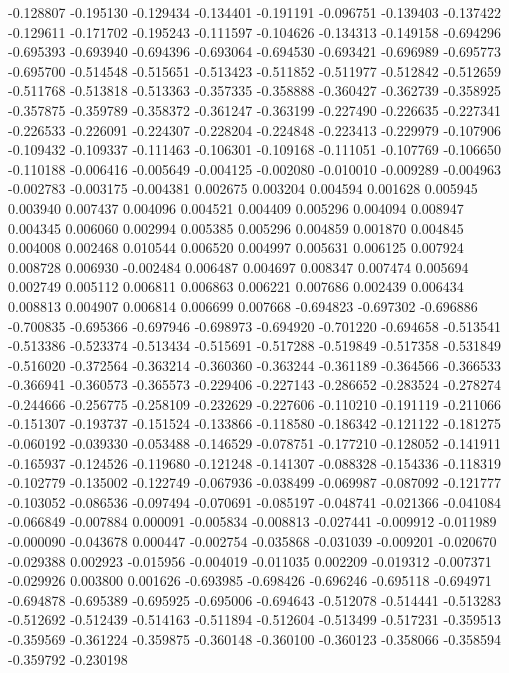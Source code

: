 -0.128807
-0.195130
-0.129434
-0.134401
-0.191191
-0.096751
-0.139403
-0.137422
-0.129611
-0.171702
-0.195243
-0.111597
-0.104626
-0.134313
-0.149158
-0.694296
-0.695393
-0.693940
-0.694396
-0.693064
-0.694530
-0.693421
-0.696989
-0.695773
-0.695700
-0.514548
-0.515651
-0.513423
-0.511852
-0.511977
-0.512842
-0.512659
-0.511768
-0.513818
-0.513363
-0.357335
-0.358888
-0.360427
-0.362739
-0.358925
-0.357875
-0.359789
-0.358372
-0.361247
-0.363199
-0.227490
-0.226635
-0.227341
-0.226533
-0.226091
-0.224307
-0.228204
-0.224848
-0.223413
-0.229979
-0.107906
-0.109432
-0.109337
-0.111463
-0.106301
-0.109168
-0.111051
-0.107769
-0.106650
-0.110188
-0.006416
-0.005649
-0.004125
-0.002080
-0.010010
-0.009289
-0.004963
-0.002783
-0.003175
-0.004381
0.002675
0.003204
0.004594
0.001628
0.005945
0.003940
0.007437
0.004096
0.004521
0.004409
0.005296
0.004094
0.008947
0.004345
0.006060
0.002994
0.005385
0.005296
0.004859
0.001870
0.004845
0.004008
0.002468
0.010544
0.006520
0.004997
0.005631
0.006125
0.007924
0.008728
0.006930
-0.002484
0.006487
0.004697
0.008347
0.007474
0.005694
0.002749
0.005112
0.006811
0.006863
0.006221
0.007686
0.002439
0.006434
0.008813
0.004907
0.006814
0.006699
0.007668
-0.694823
-0.697302
-0.696886
-0.700835
-0.695366
-0.697946
-0.698973
-0.694920
-0.701220
-0.694658
-0.513541
-0.513386
-0.523374
-0.513434
-0.515691
-0.517288
-0.519849
-0.517358
-0.531849
-0.516020
-0.372564
-0.363214
-0.360360
-0.363244
-0.361189
-0.364566
-0.366533
-0.366941
-0.360573
-0.365573
-0.229406
-0.227143
-0.286652
-0.283524
-0.278274
-0.244666
-0.256775
-0.258109
-0.232629
-0.227606
-0.110210
-0.191119
-0.211066
-0.151307
-0.193737
-0.151524
-0.133866
-0.118580
-0.186342
-0.121122
-0.181275
-0.060192
-0.039330
-0.053488
-0.146529
-0.078751
-0.177210
-0.128052
-0.141911
-0.165937
-0.124526
-0.119680
-0.121248
-0.141307
-0.088328
-0.154336
-0.118319
-0.102779
-0.135002
-0.122749
-0.067936
-0.038499
-0.069987
-0.087092
-0.121777
-0.103052
-0.086536
-0.097494
-0.070691
-0.085197
-0.048741
-0.021366
-0.041084
-0.066849
-0.007884
0.000091
-0.005834
-0.008813
-0.027441
-0.009912
-0.011989
-0.000090
-0.043678
0.000447
-0.002754
-0.035868
-0.031039
-0.009201
-0.020670
-0.029388
0.002923
-0.015956
-0.004019
-0.011035
0.002209
-0.019312
-0.007371
-0.029926
0.003800
0.001626
-0.693985
-0.698426
-0.696246
-0.695118
-0.694971
-0.694878
-0.695389
-0.695925
-0.695006
-0.694643
-0.512078
-0.514441
-0.513283
-0.512692
-0.512439
-0.514163
-0.511894
-0.512604
-0.513499
-0.517231
-0.359513
-0.359569
-0.361224
-0.359875
-0.360148
-0.360100
-0.360123
-0.358066
-0.358594
-0.359792
-0.230198
